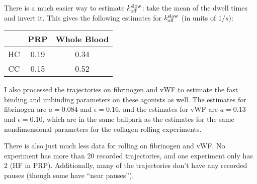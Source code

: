 \documentclass{article}
\newcommand{\tn}{\textnormal}
\begin{document}
There is a much easier way to estimate $k_\tn{off}^\tn{slow}$: take
the mean of the dwell times and invert it. This gives the following
estimates for $k_\tn{off}^\tn{slow}$ (in units of $1/s$):
\begin{tabular}{c|c|c}
  & PRP & Whole Blood \\ \hline
  HC & 0.19 & 0.34 \\ \hline
  CC & 0.15 & 0.52 
\end{tabular}

I also processed the trajectories on fibrinogen and vWF to estimate
the fast binding and unbinding parameters on these agonists as
well. The estimates for fibrinogen are $a = 0.084$ and $\epsilon =
0.16$, and the estimates for vWF are $a = 0.13$ and $\epsilon = 0.10$,
which are in the same ballpark as the estimates for the same
nondimensional parameters for the collagen rolling experiments.

There is also just much less data for rolling on fibrinogen and
vWF. No experiment has more than 20 recorded trajectories, and one
experiment only has 2 (HF in PRP). Additionally, many of the
trajectories don't have any recorded pauses (though some have ``near
pauses'').



\end{document}
